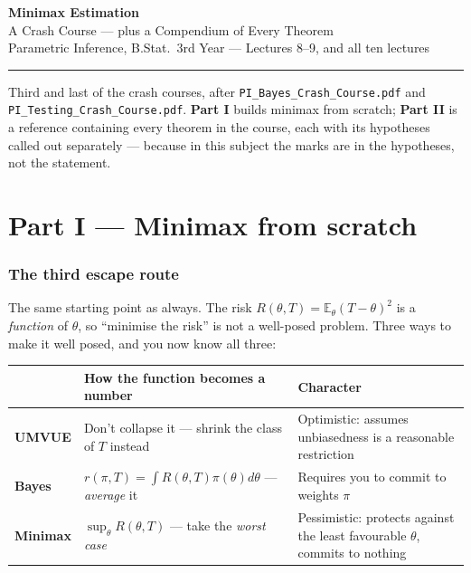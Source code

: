 \documentclass[11pt]{article}
\newcommand{\E}{\mathbb{E}}
\begin{document}
\begin{center}
{\LARGE\bfseries Minimax Estimation}\\[3pt]
{\large A Crash Course --- plus a Compendium of Every Theorem}\\[5pt]
{\small Parametric Inference, B.Stat.\ 3rd Year --- Lectures 8--9, and all ten lectures}
\end{center}

\vspace{4pt}\hrule\vspace{10pt}

\noindent
Third and last of the crash courses, after \texttt{PI\_Bayes\_Crash\_Course.pdf} and
\texttt{PI\_Testing\_Crash\_Course.pdf}. \textbf{Part I} builds minimax from scratch;
\textbf{Part II} is a reference containing every theorem in the course, each with its
hypotheses called out separately --- because in this subject the marks are in the hypotheses,
not the statement.

\tableofcontents

\newpage
\part*{Part I --- Minimax from scratch}

\section{The third escape route}

The same starting point as always. The risk $R(\theta,T)=\E_\theta(T-\theta)^2$ is a
\emph{function} of $\theta$, so ``minimise the risk'' is not a well-posed problem. Three ways
to make it well posed, and you now know all three:

\begin{center}
\renewcommand{\arraystretch}{1.4}
\begin{tabular}{@{}p{2.6cm}p{5.6cm}p{7.3cm}@{}}
\toprule
& \textbf{How the function becomes a number} & \textbf{Character} \\
\midrule
\textbf{UMVUE} & Don't collapse it --- shrink the class of $T$ instead & Optimistic: assumes unbiasedness is a reasonable restriction \\
\textbf{Bayes} & $r(\pi,T)=\int R(\theta,T)\pi(\theta)d\theta$ --- \emph{average} it & Requires you to commit to weights $\pi$ \\
\textbf{Minimax} & $\sup_\theta R(\theta,T)$ --- take the \emph{worst case} & Pessimistic: protects against the least favourable $\theta$, commits to nothing \\
\bottomrule
\end{tabular}
\end{center}
\end{document}
